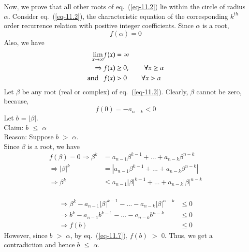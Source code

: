 \begin{multicols}{2}
Now, we prove that all other roots of eq.~(\ref{eq-11.2}) lie within the circle of radius $\alpha$. Consider eq.~(\ref{eq-11.2}), the characteristic equation of the corresponding $k^{th}$ order recurrence relation with positive integer coefficients. Since $\alpha$ is a root, 
   \begin{equation*}
     f(\alpha) = 0
   \end{equation*}
Also, we have
 \begin{align}
  \displaystyle{\lim_{x\rightarrow \infty}} f(x) &= \infty \nonumber\\
  \Rightarrow   f(x) &\ge 0, \hspace{0.3in} \forall x \ge \alpha \label{eq-11.6}\\
  \textup{and}\hspace{0.1in} f(x) &> 0  \hspace{0.3in} \forall x > \alpha \label{eq-11.7}          
 \end{align}
Let $\beta$ be any root (real or complex) of eq.~(\ref{eq-11.2}). Clearly, $\beta$ cannot be zero, because,
 \begin{equation}\nonumber
 f(0) = -a_{n-k} < 0
  \end{equation}
Let $b$ = $|\beta|$.\\
Claim: $b$ $\le$ $\alpha$\\
Reason: Suppose $b$ $>$ $\alpha$.\\
 Since $\beta$ is a root, we have
 \begin{align*}
 f(\beta) = 0 \Rightarrow \beta^{k}  &=  a_{n-1}\beta^{k-1} + \ldots + a_{n-k}\beta^{n-k} \nonumber\\
              \Rightarrow |\beta|^{k}  &=  |a_{n-1}\beta^{k-1} + \ldots + a_{n-k}\beta^{n-k}|\nonumber\\
             \Rightarrow \beta^{k}  &\leq  a_{n-1}|\beta|^{k-1} + \ldots + a_{n-k}|\beta|^{n-k}\nonumber\\
   \end{align*}
   
   \vspace{-1.5cm}
   
   \begin{align}
              \Rightarrow \beta^{k}-a_{n-1}|\beta|^{k-1} - \ldots - a_{n-k}|\beta|^{n-k} &\leq 0 \nonumber\\
              \Rightarrow b^{k}-a_{n-1}b^{k-1} - \ldots - a_{n-k}b^{n-k} &\leq 0 \nonumber\\
  \Rightarrow f(b) &\leq 0\label{eq-11.8} 
 \end{align}
However, since $b$ $>$ $\alpha$, by eq.~(\ref{eq-11.7}), $f(b)$ $>$ 0. Thus, we get a contradiction and hence $b$ $\le$ $\alpha$.


\end{multicols}
